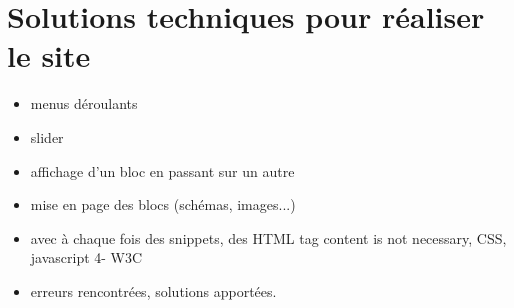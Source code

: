 \documentclass{scrartcl}
\begin{document}
\section{Solutions techniques pour réaliser le site}
\begin{itemize}
\item menus déroulants
\item slider
\item affichage d’un bloc en passant sur un autre
\item mise en page des blocs (schémas, images...)
\item avec à chaque fois des snippets, des HTML tag content is not necessary, CSS, javascript 4- W3C
\item erreurs rencontrées, solutions apportées. 

\end{itemize}
\end{document}
